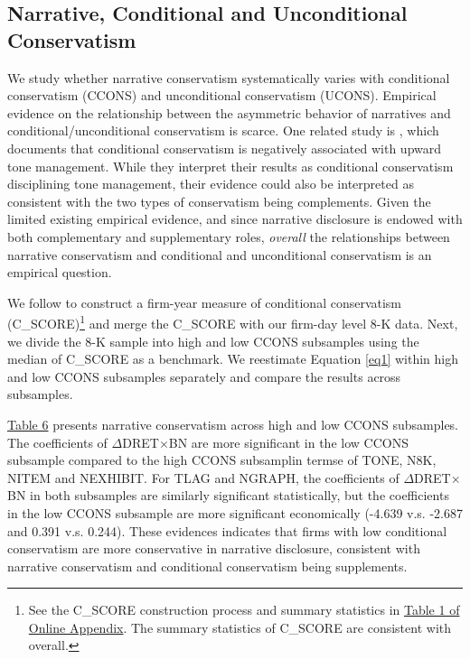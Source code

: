 \documentclass[letterpaper,12pt]{article}
\begin{document}
\begin{spacing}{1.5}
\subsection{Narrative, Conditional and Unconditional Conservatism}
\noindent We study whether narrative conservatism systematically varies with conditional conservatism (CCONS) and unconditional conservatism (UCONS). Empirical evidence on the relationship between the asymmetric behavior of narratives and conditional/unconditional conservatism is scarce. One related study is , which documents that conditional conservatism is negatively associated with upward tone management. While they interpret their results as conditional conservatism disciplining tone management, their evidence could also be interpreted as consistent with the two types of conservatism being complements. Given the limited existing empirical evidence, and since narrative disclosure is endowed with both complementary and supplementary roles, \textit{overall} the relationships between narrative conservatism and conditional and unconditional conservatism is an empirical question. 

We follow  to construct a firm-year measure of conditional conservatism (C\_SCORE)\footnote{See the C\_SCORE construction process and summary statistics in \hyperref[OAT1]{Table 1 of Online Appendix}. The summary statistics of C\_SCORE are consistent with  overall. } and merge the C\_SCORE with our firm-day level 8-K data. Next, we divide the 8-K sample into high and low CCONS subsamples using the median of C\_SCORE as a benchmark. We reestimate Equation \eqref{eq1} within high and low CCONS subsamples separately and compare the results across subsamples.

\hyperref[T6]{Table 6} presents narrative conservatism across high and low CCONS subsamples. The coefficients of $\Delta$DRET$\times$BN are more significant in the low CCONS subsample compared to the high CCONS subsamplin termse  of TONE, N8K, NITEM and NEXHIBIT. For TLAG and NGRAPH, the coefficients of $\Delta$DRET$\times$BN in both subsamples are similarly significant statistically, but the coefficients in the low CCONS subsample are more significant economically (-4.639 v.s. -2.687 and 0.391 v.s. 0.244). These evidences indicates that firms with low conditional conservatism are more conservative in narrative disclosure, consistent with narrative conservatism and conditional conservatism being supplements.


\end{spacing}
\end{document}
